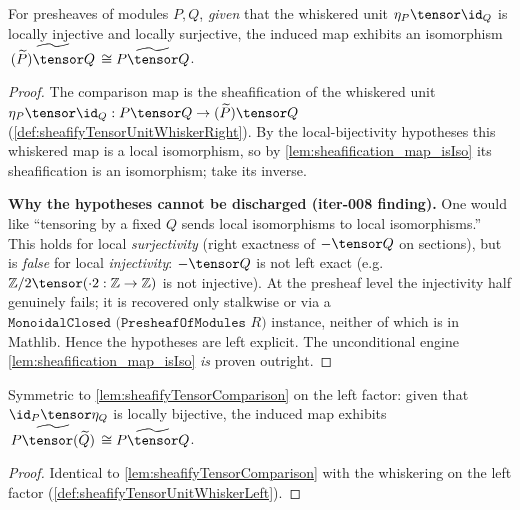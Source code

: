 \begin{lemma}
  \label{lem:sheafifyTensorComparison}
  For presheaves of modules $P, Q$, \emph{given} that the whiskered unit
  $\eta_P \tensor \id_Q$ is locally injective and locally surjective, the induced
  map exhibits an isomorphism
  $\widetilde{\,(\widetilde{P}) \tensor Q\,} \cong \widetilde{P \tensor Q}$.
  \begin{proof}
    The comparison map is the sheafification of the whiskered unit
    $\eta_P \tensor \id_Q : P \tensor Q \to (\widetilde{P}) \tensor Q$
    (\cref{def:sheafifyTensorUnitWhiskerRight}). By the local-bijectivity
    hypotheses this whiskered map is a local isomorphism, so by
    \cref{lem:sheafification_map_isIso} its sheafification is an isomorphism; take
    its inverse.

    \textbf{Why the hypotheses cannot be discharged (iter-008 finding).} One would
    like ``tensoring by a fixed $Q$ sends local isomorphisms to local
    isomorphisms.'' This holds for local \emph{surjectivity} (right exactness of
    $-\tensor Q$ on sections), but is \emph{false} for local \emph{injectivity}:
    $-\tensor Q$ is not left exact (e.g.\ $\mathbb{Z}/2 \tensor (\cdot 2:
    \mathbb{Z}\to\mathbb{Z})$ is not injective). At the presheaf level the
    injectivity half genuinely fails; it is recovered only stalkwise or via a
    $\texttt{MonoidalClosed (PresheafOfModules }R)$ instance, neither of which is in
    Mathlib. Hence the hypotheses are left explicit. The unconditional engine
    \cref{lem:sheafification_map_isIso} \emph{is} proven outright.
  \end{proof}
\end{lemma}

\begin{lemma}
  \label{lem:sheafifyTensorComparisonLeft}
  Symmetric to \cref{lem:sheafifyTensorComparison} on the left factor: given that
  $\id_P \tensor \eta_Q$ is locally bijective, the induced map exhibits
  $\widetilde{\,P \tensor (\widetilde{Q})\,} \cong \widetilde{P \tensor Q}$.
  \begin{proof}
    Identical to \cref{lem:sheafifyTensorComparison} with the whiskering on the left
    factor (\cref{def:sheafifyTensorUnitWhiskerLeft}).
  \end{proof}
\end{lemma}

